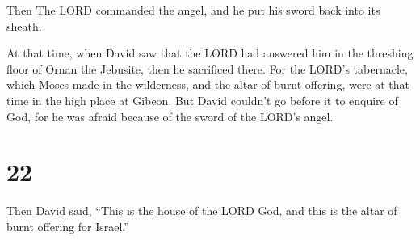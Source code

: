  Then The LORD commanded the angel, and he put his sword
back into its sheath.

 At that time, when David saw that the LORD had answered
him in the threshing floor of Ornan the Jebusite, then he sacrificed
there.  For the LORD's tabernacle, which Moses made in
the wilderness, and the altar of burnt offering, were at that time in
the high place at Gibeon.  But David couldn't go before
it to enquire of God, for he was afraid because of the sword of the
LORD's angel.

\hypertarget{section-21}{%
\section{22}\label{section-21}}

 Then David said, ``This is the house of the LORD God, and
this is the altar of burnt offering for Israel.''

